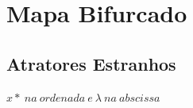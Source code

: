 \documentclass[pdftex,12pt,a4paper]{article}
\begin{document}
\begin{figure}
\section{Mapa Bifurcado}

\subsection{Atratores Estranhos}

\centering
\caption{$0 \leq \lambda \leq 4.00$.}
\caption*{ $x*\ na\ ordenada\ e\ \lambda\ na\ abscissa$ }
\end{figure}
\end{document}
